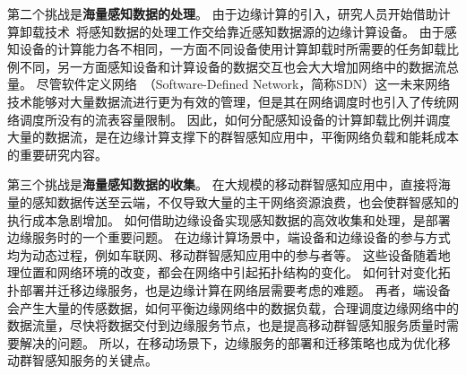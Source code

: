 第二个挑战是\textbf{海量感知数据的处理}。
由于边缘计算的引入，研究人员开始借助计算卸载技术~\cite{DBLP:journals/network/MaZZWP13}将感知数据的处理工作交给靠近感知数据源的边缘计算设备。
由于感知设备的计算能力各不相同，一方面不同设备使用计算卸载时所需要的任务卸载比例不同，另一方面感知设备和计算设备的数据交互也会大大增加网络中的数据流总量。
尽管软件定义网络~（Software-Defined Network，简称SDN）这一未来网络技术能够对大量数据流进行更为有效的管理，但是其在网络调度时也引入了传统网络调度所没有的流表容量限制。
因此，如何分配感知设备的计算卸载比例并调度大量的数据流，是在边缘计算支撑下的群智感知应用中，平衡网络负载和能耗成本的重要研究内容。


第三个挑战是\textbf{海量感知数据的收集}。
在大规模的移动群智感知应用中，直接将海量的感知数据传送至云端，不仅导致大量的主干网络资源浪费，也会使群智感知的执行成本急剧增加。
如何借助边缘设备实现感知数据的高效收集和处理，是部署边缘服务时的一个重要问题。
在边缘计算场景中，端设备和边缘设备的参与方式均为动态过程，例如车联网、移动群智感知应用中的参与者等。
这些设备随着地理位置和网络环境的改变，都会在网络中引起拓扑结构的变化。
如何针对变化拓扑部署并迁移边缘服务，也是边缘计算在网络层需要考虑的难题。
再者，端设备会产生大量的传感数据，如何平衡边缘网络中的数据负载，合理调度边缘网络中的数据流量，尽快将数据交付到边缘服务节点，也是提高移动群智感知服务质量时需要解决的问题。
所以，在移动场景下，边缘服务的部署和迁移策略也成为优化移动群智感知服务的关键点。



